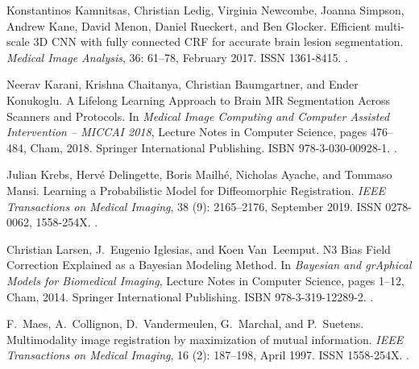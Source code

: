 \documentclass{midl}
\begin{document}
\begin{thebibliography}{50}
Konstantinos Kamnitsas, Christian Ledig, Virginia Newcombe, Joanna Simpson,
  Andrew Kane, David Menon, Daniel Rueckert, and Ben Glocker.
\newblock Efficient multi-scale {3D} {CNN} with fully connected {CRF} for
  accurate brain lesion segmentation.
\newblock \emph{Medical Image Analysis}, 36: 61--78, February
  2017{}.
\newblock ISSN 1361-8415.
\newblock {}.

Neerav Karani, Krishna Chaitanya, Christian Baumgartner, and Ender Konukoglu.
\newblock A {Lifelong} {Learning} {Approach} to {Brain} {MR} {Segmentation}
  {Across} {Scanners} and {Protocols}.
\newblock In \emph{Medical {Image} {Computing} and {Computer} {Assisted}
  {Intervention} – {MICCAI} 2018}, Lecture {Notes} in {Computer} {Science},
  pages 476--484, Cham, 2018. Springer International Publishing.
\newblock ISBN 978-3-030-00928-1.
\newblock {}.

Julian Krebs, Hervé Delingette, Boris Mailhé, Nicholas Ayache, and Tommaso
  Mansi.
\newblock Learning a {Probabilistic} {Model} for {Diffeomorphic}
  {Registration}.
\newblock \emph{IEEE Transactions on Medical Imaging}, 38
  (9): 2165--2176, September 2019.
\newblock ISSN 0278-0062, 1558-254X.
\newblock {}.

Christian Larsen, J.~Eugenio Iglesias, and Koen Van~Leemput.
\newblock N3 {Bias} {Field} {Correction} {Explained} as a {Bayesian} {Modeling}
  {Method}.
\newblock In \emph{Bayesian and {grAphical} {Models} for {Biomedical}
  {Imaging}}, Lecture {Notes} in {Computer} {Science}, pages 1--12, Cham, 2014.
  Springer International Publishing.
\newblock ISBN 978-3-319-12289-2.
\newblock {}.

F.~Maes, A.~Collignon, D.~Vandermeulen, G.~Marchal, and P.~Suetens.
\newblock Multimodality image registration by maximization of mutual
  information.
\newblock \emph{IEEE Transactions on Medical Imaging}, 16
  (2): 187--198, April 1997.
\newblock ISSN 1558-254X.
\newblock {}.


\end{thebibliography}
\end{document}
